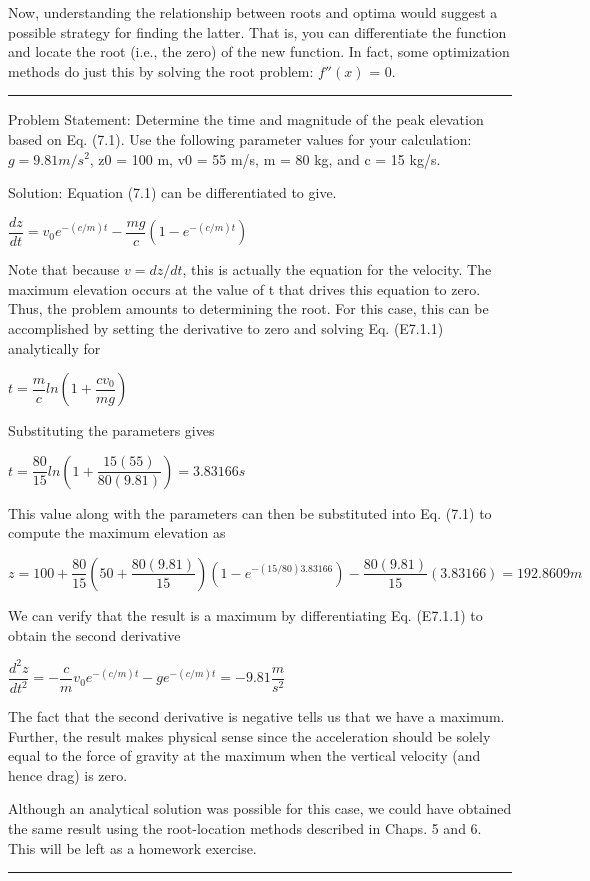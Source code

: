 \documentclass[../main.tex]{subfiles}
\begin{document}
Now, understanding the relationship between roots and optima would suggest a possible
strategy for finding the latter. That is, you can differentiate the function and locate the
root (i.e., the zero) of the new function. In fact, some optimization methods do just this by
solving the root problem: $f''(x)$ = 0.
\newline
\color{cyan}\rule{\linewidth}{1mm}
\begin{exmp}
	\color{cyan}{Determining the Optimum Analytically by Root Location}
	\color{black}
	\smallskip
	
	\noindent Problem Statement:
	Determine the time and magnitude of the peak elevation based on
	Eq. (7.1). Use the following parameter values for your calculation: $g = 9.81 m/s^2$,
	z0 = 100 m, v0 = 55 m/s, m = 80 kg, and c = 15 kg/s.

	\noindent Solution: Equation (7.1) can be differentiated to give.
	\medskip

	$\dfrac{dz}{dt}=v_0e^{-(c/m)t}-\dfrac{mg}{c}(1-e^{-(c/m)t})$
	\medskip

	\noindent Note that because $v = dz/dt$, this is actually the equation for the velocity. The maximum
	elevation occurs at the value of t that drives this equation to zero. Thus, the problem
	amounts to determining the root. For this case, this can be accomplished by setting the derivative
	to zero and solving Eq. (E7.1.1) analytically for
	\medskip

	$t = \dfrac{m}{c}ln(1+\dfrac{cv_0}{mg})$
	\medskip

	\noindent Substituting the parameters gives
	\medskip

	$t=\dfrac{80}{15}ln(1+\dfrac{15(55)}{80(9.81)})=3.83166s$
	\medskip

	\noindent This value along with the parameters can then be substituted into Eq. (7.1) to compute the
	maximum elevation as
	\medskip

	\noindent $z=100+\dfrac{80}{15}(50+\dfrac{80(9.81)}{15})(1-e^{-(15/80)3.83166})-\dfrac{80(9.81)}{15}(3.83166)=192.8609m$                      
	\medskip

	We can verify that the result is a maximum by differentiating Eq. (E7.1.1) to obtain the
	second derivative
	\medskip

	$\dfrac{d^2z}{dt^2}=-\dfrac{c}{m}v_0e^{-(c/m)t}-ge^{-(c/m)t}=-9.81\dfrac{m}{s^2} $
	\medskip

	\noindent The fact that the second derivative is negative tells us that we have a maximum. Further,
	the result makes physical sense since the acceleration should be solely equal to the force of
	gravity at the maximum when the vertical velocity (and hence drag) is zero.

	Although an analytical solution was possible for this case, we could have obtained the
	same result using the root-location methods described in Chaps. 5 and 6. This will be left
	as a homework exercise.
	\newline
	\color{cyan}\rule{\linewidth}{1mm}
\end{exmp}
\end{document}
